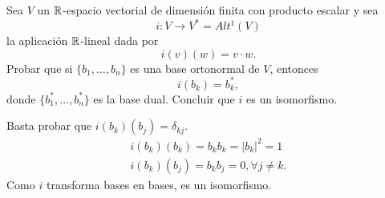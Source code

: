 \documentclass[twoside]{article}
\begin{document}
\begin{ejercicio}{2.4}
Sea $V$ un $\mathbb{R}$-espacio vectorial de dimensión finita con producto escalar y sea 
$$i:V\to V^*=Alt^1(V)$$
la aplicación $\mathbb{R}$-lineal dada por 
$$i(v)(w)=v\cdot w.$$
Probar que si $\{b_1,\dots, b_n\}$ es una base ortonormal de $V$, entonces
$$i(b_k)=b_k^*,$$
donde $\{b_1^*,\dots, b_n^*\}$ es la base dual. Concluir que $i$ es un isomorfismo.
\end{ejercicio}
\begin{solucion}
Basta probar que $i(b_k)(b_j)=\delta_{kj}$. 
\begin{gather*}
i(b_k)(b_k)=b_kb_k=|b_k|^2=1\\
i(b_k)(b_j)=b_kb_j=0, \forall j\neq k.
\end{gather*}
Como $i$ transforma bases en bases, es un isomorfismo.
\end{solucion}

\newpage
\end{document}
